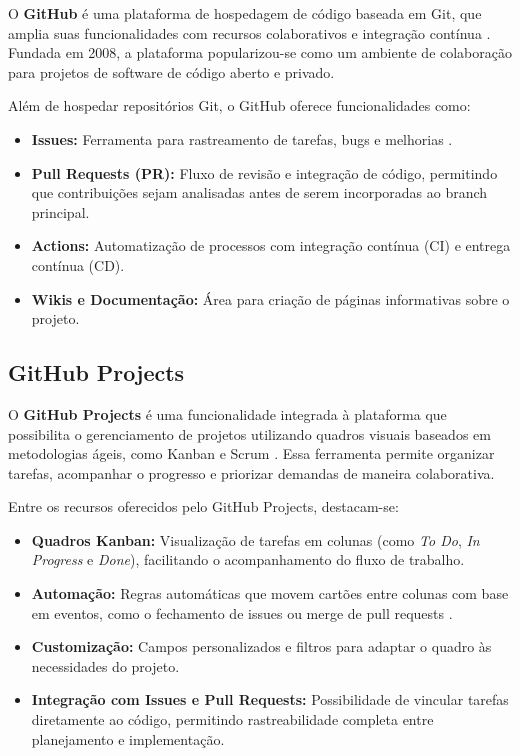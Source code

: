 O \textbf{GitHub} é uma plataforma de hospedagem de código baseada em Git, que amplia suas funcionalidades com recursos colaborativos e integração contínua \cite{github_official}. Fundada em 2008, a plataforma popularizou-se como um ambiente de colaboração para projetos de software de código aberto e privado.

Além de hospedar repositórios Git, o GitHub oferece funcionalidades como:

\begin{itemize}
\item \textbf{Issues:} Ferramenta para rastreamento de tarefas, bugs e melhorias \cite{github_official}.
\item \textbf{Pull Requests (PR):} Fluxo de revisão e integração de código, permitindo que contribuições sejam analisadas antes de serem incorporadas ao branch principal.
\item \textbf{Actions:} Automatização de processos com integração contínua (CI) e entrega contínua (CD).
\item \textbf{Wikis e Documentação:} Área para criação de páginas informativas sobre o projeto.
\end{itemize}

\subsection{GitHub Projects}
\label{subsec:github-projects}

O \textbf{GitHub Projects} é uma funcionalidade integrada à plataforma que possibilita o gerenciamento de projetos utilizando quadros visuais baseados em metodologias ágeis, como Kanban e Scrum \cite{github_projects}. Essa ferramenta permite organizar tarefas, acompanhar o progresso e priorizar demandas de maneira colaborativa.

Entre os recursos oferecidos pelo GitHub Projects, destacam-se:

\begin{itemize}
\item \textbf{Quadros Kanban:} Visualização de tarefas em colunas (como \textit{To Do}, \textit{In Progress} e \textit{Done}), facilitando o acompanhamento do fluxo de trabalho.
\item \textbf{Automação:} Regras automáticas que movem cartões entre colunas com base em eventos, como o fechamento de issues ou merge de pull requests \cite{github_projects}.
\item \textbf{Customização:} Campos personalizados e filtros para adaptar o quadro às necessidades do projeto.
\item \textbf{Integração com Issues e Pull Requests:} Possibilidade de vincular tarefas diretamente ao código, permitindo rastreabilidade completa entre planejamento e implementação.
\end{itemize}







